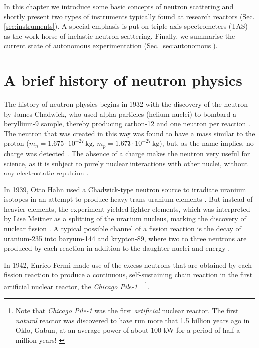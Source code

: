 %
%

In this chapter we introduce some basic concepts of neutron scattering and shortly present two types of instruments typically found at research reactors (Sec. \ref{sec:instruments}). A special emphasis is put on triple-axis spectrometers (TAS) as the work-horse of inelastic neutron scattering. Finally, we summarise the current state of autonomous experimentation (Sec. \ref{sec:autonomous}).



\section{A brief history of neutron physics \label{sec:neutrons}}

The history of neutron physics begins in 1932 with the discovery of the neutron by James Chadwick, who used alpha particles (helium nuclei) to bombard a beryllium-9 sample, thereby producing carbon-12 and one neutron per reaction \cite[p. 1]{Jacrot2021}. The neutron that was created in this way was found to have a mass similar to the proton ($m_n = 1.675\cdot10^{-27}\,\mathrm{kg}$, $m_p = 1.673\cdot10^{-27}\,\mathrm{kg}$), but, as the name implies, no charge was detected \cite[p. 2]{Squires2012}. The absence of a charge makes the neutron very useful for science, as it is subject to purely nuclear interactions with other nuclei, without any electrostatic repulsion \cite[p. 1]{Squires2012}.

In 1939, Otto Hahn used a Chadwick-type neutron source to irradiate uranium isotopes in an attempt to produce heavy trans-uranium elements \cite{wiki_fission}. But instead of heavier elements, the experiment yielded lighter elements, which was interpreted by Lise Meitner as a splitting of the uranium nucleus, marking the discovery of nuclear fission \cite{wiki_fission}. A typical possible channel of a fission reaction is the decay of uranium-235 into baryum-144 and krypton-89, where two to three neutrons are produced by each reaction in addition to the daughter nuclei and energy \cite{wiki_fission}.

In 1942, Enrico Fermi made use of the excess neutrons that are obtained by each fission reaction to produce a continuous, self-sustaining chain reaction in the first artificial nuclear reactor, the \textit{Chicago Pile-1}~\cite[p.1]{Jacrot2021}~\footnote{Note that \textit{Chicago Pile-1} was the first \textit{artificial} nuclear reactor. The first \textit{natural} reactor was discovered to have run more that 1.5 billion years ago in Oklo, Gabun, at an average power of about 100 kW for a period of half a million years! \cite{wiki_oklo}}.

